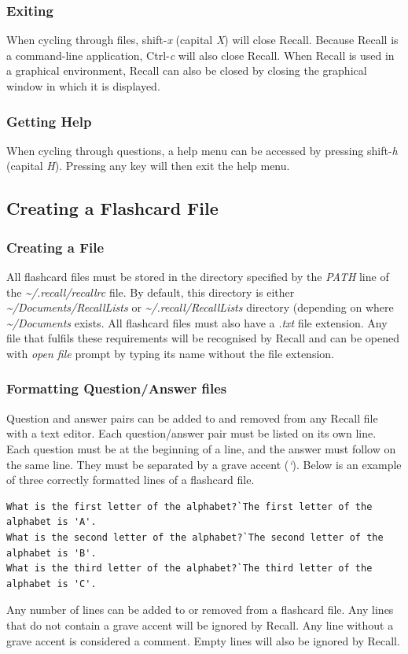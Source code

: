 \documentclass[letterpaper]{article}
\begin{document}
\subsubsection{Exiting}
When cycling through files, shift-\textit{x} (capital \textit{X}) will close Recall. Because Recall is a command-line application, Ctrl-\textit{c} will also close Recall. When Recall is used in a graphical environment, Recall can also be closed by closing the graphical window in which it is displayed.

\subsubsection{Getting Help}
When cycling through questions, a help menu can be accessed by pressing shift-\textit{h} (capital \textit{H}). Pressing any key will then exit the help menu.

\subsection{Creating a Flashcard File}
\subsubsection{Creating a File}
All flashcard files must be stored in the directory specified by the \textit{PATH} line of the \textit{\~{}/.recall/recallrc} file. By default, this directory is either \textit{\~{}/Documents/RecallLists} or \textit{\~{}/.recall/RecallLists} directory (depending on where \textit{\~{}/Documents} exists. All flashcard files must also have a \textit{.txt} file extension. Any file that fulfils these requirements will be recognised by Recall and can be opened with \textit{open file} prompt by typing its name without the file extension.

\subsubsection{Formatting Question/Answer files}
Question and answer pairs can be added to and removed from any Recall file with a text editor. Each question/answer pair must be listed on its own line. Each question must be at the beginning of a line, and the answer must follow on the same line. They must be separated by a grave accent (\textit{`}). Below is an example of three correctly formatted lines of a flashcard file.
\begin{verbatim}
What is the first letter of the alphabet?`The first letter of the alphabet is 'A'.
What is the second letter of the alphabet?`The second letter of the alphabet is 'B'.
What is the third letter of the alphabet?`The third letter of the alphabet is 'C'.
\end{verbatim}
Any number of lines can be added to or removed from a flashcard file. Any lines that do not contain a grave accent will be ignored by Recall. Any line without a grave accent is considered a comment. Empty lines will also be ignored by Recall.
\end{document}
